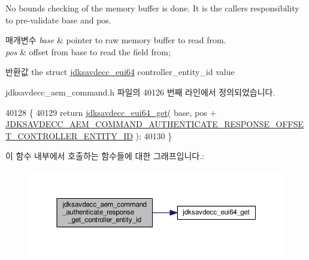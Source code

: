 No bounds checking of the memory buffer is done. It is the caller\textquotesingle{}s responsibility to pre-\/validate base and pos.


\begin{DoxyParams}{매개변수}
{\em base} & pointer to raw memory buffer to read from. \\
\hline
{\em pos} & offset from base to read the field from; \\
\hline
\end{DoxyParams}
\begin{DoxyReturn}{반환값}
the struct \hyperlink{structjdksavdecc__eui64}{jdksavdecc\+\_\+eui64} controller\+\_\+entity\+\_\+id value 
\end{DoxyReturn}


jdksavdecc\+\_\+aem\+\_\+command.\+h 파일의 40126 번째 라인에서 정의되었습니다.


\begin{DoxyCode}
40128 \{
40129     \textcolor{keywordflow}{return} \hyperlink{group__eui64_ga2652311a25a6b91cddbed75c108c7031}{jdksavdecc\_eui64\_get}( base, pos + 
      \hyperlink{group__command__authenticate__response_gaa7dad1e04cd9f879068c1bdf77157c3c}{JDKSAVDECC\_AEM\_COMMAND\_AUTHENTICATE\_RESPONSE\_OFFSET\_CONTROLLER\_ENTITY\_ID}
       );
40130 \}
\end{DoxyCode}


이 함수 내부에서 호출하는 함수들에 대한 그래프입니다.\+:
\nopagebreak
\begin{figure}[H]
\begin{center}
\leavevmode
\includegraphics[width=350pt]{group__command__authenticate__response_ga38d3412175fd13659e75643aef1ce4a1_cgraph}
\end{center}
\end{figure}


